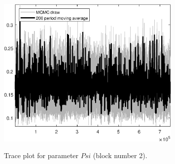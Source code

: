 \begin{figure}[H]
\centering
  \includegraphics[width=0.8\textwidth]{directed_search_est/graphs/TracePlot_Psi_blck_2}\\
    \caption{Trace plot for parameter $Psi$ (block number 2).}
\end{figure}
